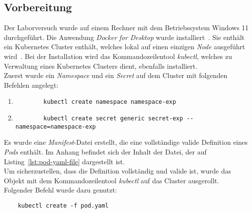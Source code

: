 \subsection{Vorbereitung}\label{subsec:preparation}
Der Laborversuch wurde auf einem Rechner mit dem Betriebssystem Windows 11 durchgeführt.
Die Anwendung \textit{Docker for Desktop} wurde installiert~\cite{docker-for-desktop-overview}. Sie enthält ein Kubernetes Cluster enthält,
welches lokal auf einen einzigen \textit{Node} ausgeführt wird~\cite{docker-for-desktop-kubernetes}.
Bei der Installation wird das Kommandozeilentool \textit{kubectl}, welches zu Verwaltung eines Kubernetes Clusters dient, ebenfalls installiert.
\\
Zuerst wurde ein \textit{Namespace} und ein \textit{Secret} auf dem Cluster mit folgenden Befehlen angelegt:
\begin{enumerate}
    \item
          \begin{verbatim}
        kubectl create namespace namespace-exp
    \end{verbatim}
    \item
          \begin{verbatim}
        kubectl create secret generic secret-exp --namespace=namespace-exp
    \end{verbatim}
\end{enumerate}
Es wurde eine \textit{Manifest}-Datei erstellt, die eine vollständige valide Definition eines \textit{Pods} enthält.
Im Anhang befindet sich der Inhalt der Datei, der auf Listing~\ref{lst:pod-yaml-file} dargestellt ist.
\\
Um sicherzustellen, dass die Definition vollständig und valide ist, wurde das Objekt mit dem Kommandozeilentool \textit{kubectl} auf das Cluster ausgerollt.
Folgender Befehl wurde dazu genutzt:

\begin{verbatim}
    kubectl create -f pod.yaml
\end{verbatim}

